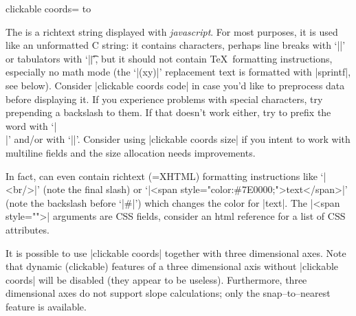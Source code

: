\begin{pgfplotskey}{clickable coords=}
	\noindent\hbox to %

	The  is a richtext string displayed with \emph{javascript}. For most purposes, it is used like an unformatted C string: it contains characters, perhaps line breaks with `|\n|' or tabulators with `|\t|', but it should not contain \TeX\ formatting instructions, especially no math mode (the `|(xy)|' replacement text is formatted with |sprintf|, see below). Consider |clickable coords code| in case you'd like to preprocess data before displaying it. If you experience problems with special characters, try prepending a backslash to them. If that doesn't work either, try to prefix the word with `|\\|' and/or with `|\string|'. Consider using |clickable coords size| if you intent to work with multiline fields and the size allocation needs improvements.

	In fact,  can even contain richtext (=XHTML) formatting instructions like `|<br/>|' (note the final slash) or `|<span style="color:\#7E0000;">text</span>|' (note the backslash before `|#|') which changes the color for |text|. The |<span style="">| arguments are CSS fields, consider an html reference for a list of CSS attributes.

	It is possible to use |clickable coords| together with three dimensional axes. Note that dynamic (clickable) features of a three dimensional axis without |clickable coords| will be disabled (they appear to be useless). Furthermore, three dimensional axes do not support slope calculations; only the snap--to--nearest feature is available.


\end{pgfplotskey}
